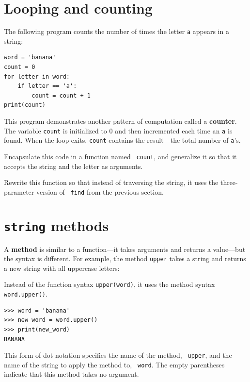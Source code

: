 \documentclass[10pt]{book}
\begin{document}
\section{Looping and counting}
\label{counter}


The following program counts the number of times the letter {\tt a}
appears in a string:

\beforeverb
\begin{verbatim}
word = 'banana'
count = 0
for letter in word:
    if letter == 'a':
        count = count + 1
print(count)
\end{verbatim}
\afterverb
%
This program demonstrates another pattern of computation called a {\bf
counter}.  The variable {\tt count} is initialized to 0 and then
incremented each time an {\tt a} is found.
When the loop exits, {\tt count}
contains the result---the total number of {\tt a}'s.

\begin{ex}

Encapsulate this code in a function named {\tt
count}, and generalize it so that it accepts the string and the
letter as arguments.
\end{ex}

\begin{ex}
Rewrite this function so that instead of
traversing the string, it uses the three-parameter version of {\tt
find} from the previous section.
\end{ex}


\section{{\tt string} methods}

A {\bf method} is similar to a function---it takes arguments and
returns a value---but the syntax is different.  For example, the
method {\tt upper} takes a string and returns a new string with
all uppercase letters:


Instead of the function syntax {\tt upper(word)}, it uses
the method syntax {\tt word.upper()}.


\beforeverb
\begin{verbatim}
>>> word = 'banana'
>>> new_word = word.upper()
>>> print(new_word)
BANANA
\end{verbatim}
\afterverb
%
This form of dot notation specifies the name of the method, {\tt
upper}, and the name of the string to apply the method to, {\tt
word}.  The empty parentheses indicate that this method takes no
argument.
\end{document}
